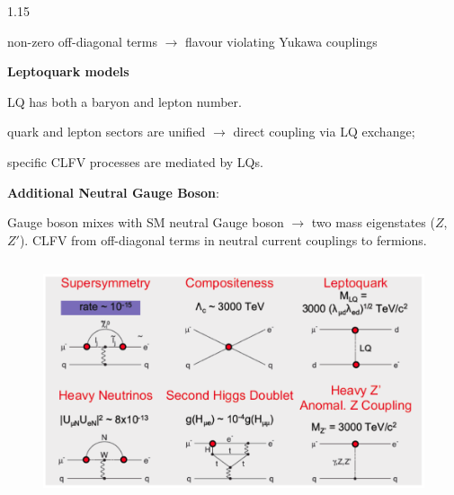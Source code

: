 \documentclass{beamer}
\begin{document}
\begin{frame}
\begin{columns}
\begin{column}{1.15\framewidth}
\begin{itemize}
\begin{itemize}
{        \item non-zero off-diagonal terms $\rightarrow$ flavour violating Yukawa couplings}
    \end{itemize}
    {\footnotesize  \item \textbf{Leptoquark models}}
    \begin{itemize}
        {\footnotesize   \item LQ has both a baryon and lepton number. 
        \item quark and lepton sectors are unified $\rightarrow$ direct coupling via LQ exchange;
        \item specific CLFV processes are mediated by LQs.}

    \end{itemize}
    {\footnotesize  \item  \textbf{Additional Neutral Gauge Boson}: }
    \begin{itemize}
        {\footnotesize   \item Gauge boson mixes with SM neutral Gauge boson $\rightarrow$
        two mass eigenstates ($Z$, $Z'$). CLFV from off-diagonal terms in neutral
        current couplings to fermions.}

    \end{itemize}


\end{itemize}
\end{column}
\end{columns}
\end{frame}


\begin{frame}
    \begin{figure}[h]
        \centering
        \includegraphics[width=1.\textwidth]{figures/png/Screenshot_20240927_131322.png}
    \end{figure} 
\end{frame}
\end{document}
